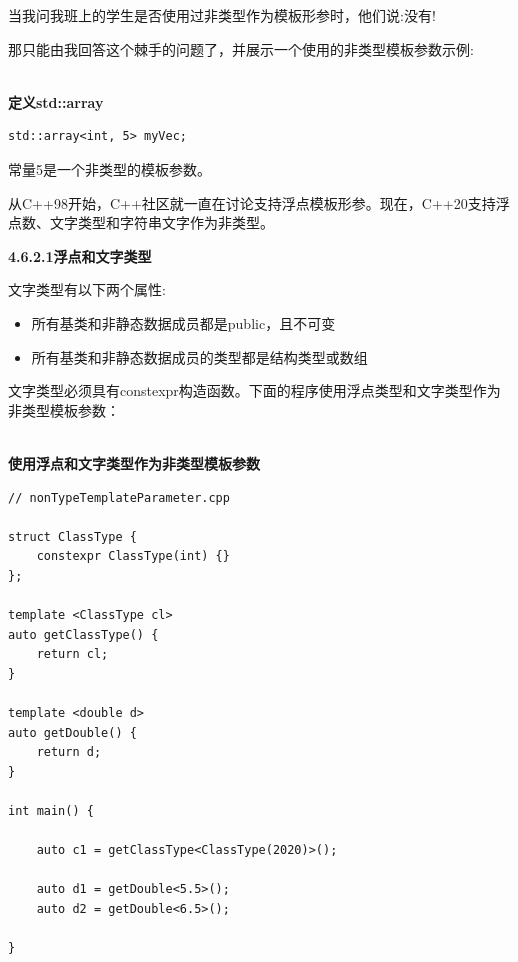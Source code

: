 \begin{tcolorbox}[breakable,enhanced jigsaw,colback=mygreen!5!white,colframe=mygreen!75!black,title={典型的非类型模板参数}]
	
当我问我班上的学生是否使用过非类型作为模板形参时，他们说:没有!

那只能由我回答这个棘手的问题了，并展示一个使用的非类型模板参数示例:

\hspace*{\fill} \\ %
\noindent
\textbf{定义std::array}
\begin{lstlisting}[style=styleCXX]
std::array<int, 5> myVec;
\end{lstlisting}

常量5是一个非类型的模板参数。
\end{tcolorbox}	

从C++98开始，C++社区就一直在讨论支持浮点模板形参。现在，C++20支持浮点数、文字类型和字符串文字作为非类型。

\noindent
\textbf{4.6.2.1\hspace{0.2cm}浮点和文字类型}

文字类型有以下两个属性:

\begin{itemize}
\item 
所有基类和非静态数据成员都是public，且不可变

\item 
所有基类和非静态数据成员的类型都是结构类型或数组
\end{itemize}

文字类型必须具有constexpr构造函数。下面的程序使用浮点类型和文字类型作为非类型模板参数：

\hspace*{\fill} \\ %
\noindent
\textbf{使用浮点和文字类型作为非类型模板参数}
\begin{lstlisting}[style=styleCXX]
// nonTypeTemplateParameter.cpp

struct ClassType {
	constexpr ClassType(int) {}
};

template <ClassType cl>
auto getClassType() {
	return cl;
}

template <double d>
auto getDouble() {
	return d;
}

int main() {

	auto c1 = getClassType<ClassType(2020)>();
	
	auto d1 = getDouble<5.5>();
	auto d2 = getDouble<6.5>();

}
\end{lstlisting}

